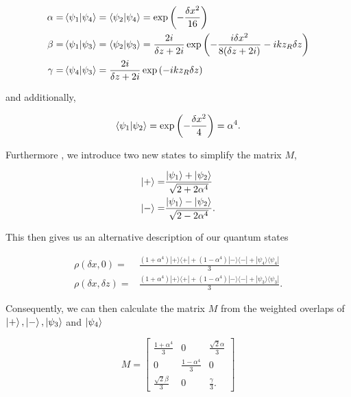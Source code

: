 \documentclass{article}
\newcommand{\ketbra}[2]{|#1\rangle\langle#2|}
\begin{document}
\begin{equation}
\begin{aligned}
\alpha =& \braket{\psi_1|\psi_4} = \braket{\psi_2|\psi_4} = \exp \left(-\frac{\delta x^2}{16} \right) \\
\beta =& \braket{\psi_1|\psi_3} = \braket{\psi_2|\psi_3} = \frac{2i}{\delta z + 2i} \exp \left(-\frac{i \delta x^2}{8(\delta z + 2i)} - i k z_R \delta z \right) \\
\gamma =& \braket{\psi_4|\psi_3} = \frac{2i}{\delta z + 2i} \exp \left( -i k z_R \delta z \right)
\end{aligned}
\end{equation}

and additionally,

\begin{equation}
\braket{\psi_1|\psi_2} = \exp \left(-\frac{\delta x^2}{4} \right) = \alpha^4.
\end{equation}

 Furthermore , we introduce two new states to simplify the matrix $M$,

\begin{equation}
\begin{aligned}
\ket{+} =&\frac{\ket{\psi_1} + \ket{\psi_2}}{\sqrt{2 + 2\alpha^4}} \\
\ket{-} =& \frac{\ket{\psi_1} - \ket{\psi_2}}{\sqrt{2 - 2\alpha^4}}.
\end{aligned}
\end{equation}

This then gives us an alternative description of our quantum states

\begin{equation}
\begin{aligned}
\rho(\delta x, 0) =& \frac{(1+\alpha^4)\ketbra{+}{+} + (1-\alpha^4)\ketbra{-}{-} + \ketbra{\psi_4}{\psi_4}}{3} \\
\rho(\delta x, \delta z) =& \frac{(1+\alpha^4)\ketbra{+}{+} + (1-\alpha^4)\ketbra{-}{-} + \ketbra{\psi_3}{\psi_3}}{3}.
\end{aligned}
\end{equation}

Consequently, we can then calculate the matrix $M$ from the weighted overlaps of $\ket{+}, \ket{-}, \ket{\psi_3}$ and $\ket{\psi_4}$

\begin{equation}
M = \begin{bmatrix}
\frac{1+\alpha^4}{3} & 0 & \frac{\sqrt{2} \alpha}{3} \\
0 & \frac{1 - \alpha^4}{3} & 0 \\
\frac{\sqrt{2} \beta}{3} & 0 & \frac{\gamma}{3}.
\end{bmatrix}
\end{equation}
\end{document}
